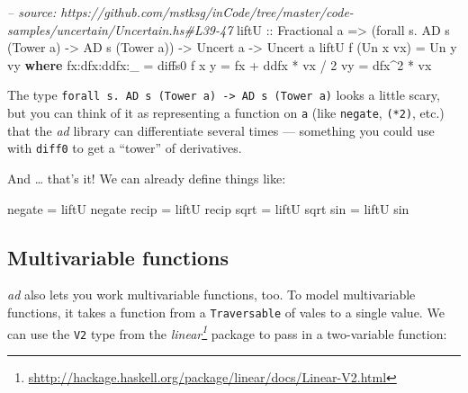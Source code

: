 \documentclass[]{article}
\newenvironment{Shaded}{}{}
\newcommand{\KeywordTok}[1]{\textcolor[rgb]{0.00,0.44,0.13}{\textbf{{#1}}}}
\newcommand{\DataTypeTok}[1]{\textcolor[rgb]{0.56,0.13,0.00}{{#1}}}
\newcommand{\DecValTok}[1]{\textcolor[rgb]{0.25,0.63,0.44}{{#1}}}
\newcommand{\CommentTok}[1]{\textcolor[rgb]{0.38,0.63,0.69}{\textit{{#1}}}}
\newcommand{\OtherTok}[1]{\textcolor[rgb]{0.00,0.44,0.13}{{#1}}}
\newcommand{\FunctionTok}[1]{\textcolor[rgb]{0.02,0.16,0.49}{{#1}}}
\newcommand{\NormalTok}[1]{{#1}}
\renewcommand{\href}[2]{#2\footnote{\url{#1}}}
\begin{document}
\begin{Shaded}
\begin{Highlighting}[]
\CommentTok{-- source: https://github.com/mstksg/inCode/tree/master/code-samples/uncertain/Uncertain.hs#L39-47}
\OtherTok{liftU ::} \DataTypeTok{Fractional} \NormalTok{a}
      \OtherTok{=>} \NormalTok{(forall s}\FunctionTok{.} \DataTypeTok{AD} \NormalTok{s (}\DataTypeTok{Tower} \NormalTok{a) }\OtherTok{->} \DataTypeTok{AD} \NormalTok{s (}\DataTypeTok{Tower} \NormalTok{a))}
      \OtherTok{->} \DataTypeTok{Uncert} \NormalTok{a}
      \OtherTok{->} \DataTypeTok{Uncert} \NormalTok{a}
\NormalTok{liftU f (}\DataTypeTok{Un} \NormalTok{x vx) }\FunctionTok{=} \DataTypeTok{Un} \NormalTok{y vy}
  \KeywordTok{where}
    \NormalTok{fx}\FunctionTok{:}\NormalTok{dfx}\FunctionTok{:}\NormalTok{ddfx}\FunctionTok{:}\NormalTok{_ }\FunctionTok{=} \NormalTok{diffs0 f x}
    \NormalTok{y             }\FunctionTok{=} \NormalTok{fx }\FunctionTok{+} \NormalTok{ddfx }\FunctionTok{*} \NormalTok{vx }\FunctionTok{/} \DecValTok{2}
    \NormalTok{vy            }\FunctionTok{=} \NormalTok{dfx}\FunctionTok{^}\DecValTok{2} \FunctionTok{*} \NormalTok{vx}
\end{Highlighting}
\end{Shaded}

The type
\texttt{forall\ s.\ AD\ s\ (Tower\ a)\ -\textgreater{}\ AD\ s\ (Tower\ a)} looks
a little scary, but you can think of it as representing a function on \texttt{a}
(like \texttt{negate}, \texttt{(*2)}, etc.) that the \emph{ad} library can
differentiate several times --- something you could use with \texttt{diff0} to
get a ``tower'' of derivatives.

And \ldots{} that's it! We can already define things like:

\begin{Shaded}
\begin{Highlighting}[]
\NormalTok{negate }\FunctionTok{=} \NormalTok{liftU negate}
\NormalTok{recip  }\FunctionTok{=} \NormalTok{liftU recip}
\NormalTok{sqrt   }\FunctionTok{=} \NormalTok{liftU sqrt}
\NormalTok{sin    }\FunctionTok{=} \NormalTok{liftU sin}
\end{Highlighting}
\end{Shaded}

\subsection{Multivariable functions}\label{multivariable-functions}

\emph{ad} also lets you work multivariable functions, too. To model
multivariable functions, it takes a function from a \texttt{Traversable} of
vales to a single value. We can use the \texttt{V2} type from the
\emph{\href{shttp://hackage.haskell.org/package/linear/docs/Linear-V2.html}{linear}}
package to pass in a two-variable function:
\end{document}
